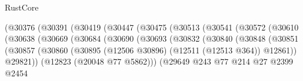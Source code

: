 \begin{lexlean}{RustCore}
\begin{coremodule}
                                        (@30376
                                          (@30391
                                            (@30419
                                              (@30447
                                                (@30475
                                                  (@30513
                                                    (@30541
                                                      (@30572
                                                        (@30610
                                                          (@30638
                                                            (@30669
                                                              (@30684
                                                                (@30690
                                                                  (@30693
                                                                    (@30832
                                                                      (@30840
                                                                        (@30848
                                                                          (@30851
                                                                            (@30857
                                                                              (@30860
                                                                                (@30895
                                                                                  (@12506 @30896)
                                                                                  (@12511
                                                                                    (@12513 @364))
                                                                                  @12861))
                                                                              @29821))
                                                                          (@12823
                                                                            (@20048 @77 @5862)))
                                                                        (@29649
                                                                          @243
                                                                          @77
                                                                          @214
                                                                          @27
                                                                          @2399
                                                                          @2454

\end{coremodule}
\end{lexlean}
